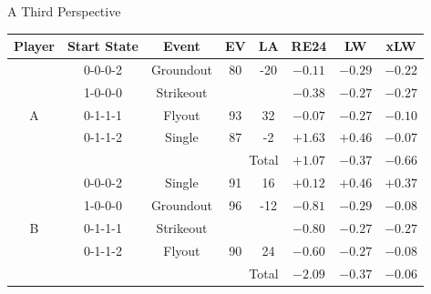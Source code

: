 \documentclass[handout]{beamer}
\begin{document}
\begin{frame}{A Third Perspective}
  \footnotesize
  \begin{tabular}{c|cccc|ccc}
    Player  & Start State & Event     & \color{ricerichblue} EV  & \color{ricerichblue} LA   & RE24    & LW      & \color{ricerichblue} xLW\\
    \hline
            & 0-0-0-2     & Groundout & \color{ricerichblue} 80  & \color{ricerichblue} -20  & $-0.11$ & $-0.29$ & \color{ricerichblue} $-0.22$\\
            & 1-0-0-0     & Strikeout &                          & \color{ricerichblue}      & $-0.38$ & $-0.27$ & \color{ricerichblue} $-0.27$\\
    A       & 0-1-1-1     & Flyout    & \color{ricerichblue} 93  & \color{ricerichblue}  32  & $-0.07$ & $-0.27$ & \color{ricerichblue} $-0.10$\\
            & 0-1-1-2     & Single    & \color{ricerichblue} 87  & \color{ricerichblue}  -2  & $+1.63$ & $+0.46$ & \color{ricerichblue} $-0.07$\\
      & \multicolumn{4}{r|}{\color{ricegray} Total} & \color{ricegray} $+1.07$ & \color{ricegray} $-0.37$ & \color{ricegray} $-0.66$\\
    \hline
            & 0-0-0-2     & Single    & \color{ricerichblue} 91  & \color{ricerichblue}  16  & $+0.12$ & $+0.46$ & \color{ricerichblue} $+0.37$\\
            & 1-0-0-0     & Groundout & \color{ricerichblue} 96  & \color{ricerichblue} -12  & $-0.81$ & $-0.29$ & \color{ricerichblue} $-0.08$\\
    B       & 0-1-1-1     & Strikeout &                          & \color{ricerichblue}      & $-0.80$ & $-0.27$ & \color{ricerichblue} $-0.27$\\
            & 0-1-1-2     & Flyout    & \color{ricerichblue} 90  & \color{ricerichblue}  24  & $-0.60$ & $-0.27$ & \color{ricerichblue} $-0.08$\\
      & \multicolumn{4}{r|}{\color{ricegray} Total} & \color{ricegray} $-2.09$ & \color{ricegray} $-0.37$ & \color{ricegray} $-0.06$\\
  \end{tabular}
\end{frame}

\end{document}
